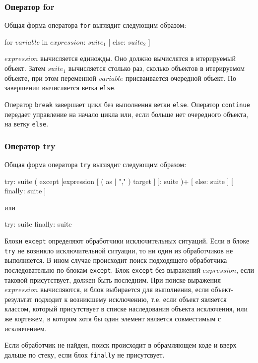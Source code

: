 \subsubsection{Оператор for}
Общая форма оператора \lstinline{for} выглядит следующим образом:
\begin{pylst}{}{}
for $variable$ in $expression$: $suite_1$
[ else: $suite_2$ ]
\end{pylst}

$expression$ вычисляется единожды. Оно должно вычислятся в итерируемый объект. Затем $suite_1$ вычисляется столько раз, сколько объектов в итерируемом объекте, при этом переменной $variable$ присваивается очередной объект. По завершении вычисляется ветка \lstinline{else}.

Оператор \lstinline{break} завершает цикл без выполнения ветки \lstinline{else}. Оператор \lstinline{continue} передает управление на начало цикла или, если больше нет очередного объекта, на ветку \lstinline{else}.

\subsubsection{Оператор try}
Общая форма оператора \lstinline{try} выглядит следующим образом:
\begin{pylst}{}{}
try: suite
( except [expression [ ( as | "," ) target ] ]: suite )+
[ else: suite ]
[ finally: suite ]
\end{pylst}
или
\begin{pylst}{}{}
try: suite
finally: suite
\end{pylst}

Блоки \lstinline{except} определяют обработчики исключительных ситуаций. Если в блоке \lstinline{try} не возникло исключительной ситуации, то ни один из обработчиков не выполняется. В ином случае происходит поиск подходящего обработчика последовательно по блокам \lstinline{except}. Блок \lstinline{except} без выражений $expression$, если таковой присутствует, должен быть последним. При поиске выражения $expression$ вычисляются, и блок выбирается для выполнения, если объект-результат подходит к возникшему исключению, т.е. если объект является классом, который присутствует в списке наследования объекта исключения, или же кортежем, в котором хотя бы один элемент является совместимым с исключением.

Если обработчик не найден, поиск происходит в обрамляющем коде и вверх дальше по стеку, если блок \lstinline{finally} не присутсвует.

